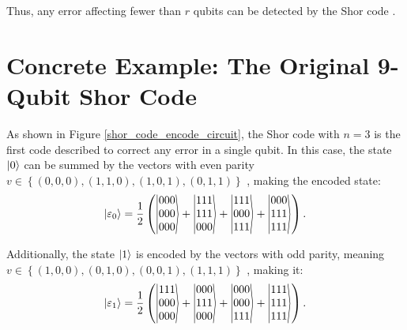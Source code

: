 Thus, any error affecting fewer than $r$ qubits can be detected by the Shor code \citep{Cesar2024}.

\section{Concrete Example: The Original 9-Qubit Shor Code}

As shown in Figure \ref{shor_code_encode_circuit}, the Shor code with $n = 3$ is the first code described to correct any error in a single qubit. In this case, the state $\ket{0}$ can be summed by the vectors with even parity $v \in \left\{(0, 0, 0), (1, 1, 0), (1, 0, 1), (0, 1, 1)\right\}$ \citep{Cesar2024}, making the encoded state:
\begin{equation}
  \ket{\varepsilon_0} = \frac{1}{2}\left(
  \stretchleftright{|}{\begin{matrix}000\\000\\000\end{matrix}}{\rangle} + 
  \stretchleftright{|}{\begin{matrix}111\\111\\000\end{matrix}}{\rangle} +
  \stretchleftright{|}{\begin{matrix}111\\000\\111\end{matrix}}{\rangle} +
  \stretchleftright{|}{\begin{matrix}000\\111\\111\end{matrix}}{\rangle}
    \right)
  \label{eq:encoded_shor_9_0}
.\end{equation}

Additionally, the state $\ket{1}$ is encoded by the vectors with odd parity, meaning $v \in \left\{(1, 0, 0), (0, 1, 0), (0, 0, 1), (1, 1, 1)\right\}$ \citep{Cesar2024}, making it:
\begin{equation}
  \ket{\varepsilon_1} = \frac{1}{2}\left(
  \stretchleftright{|}{\begin{matrix}111\\000\\000\end{matrix}}{\rangle} + 
  \stretchleftright{|}{\begin{matrix}000\\111\\000\end{matrix}}{\rangle} +
  \stretchleftright{|}{\begin{matrix}000\\000\\111\end{matrix}}{\rangle} +
  \stretchleftright{|}{\begin{matrix}111\\111\\111\end{matrix}}{\rangle}
    \right)
  \label{eq:encoded_shor_9_1}
.\end{equation}

